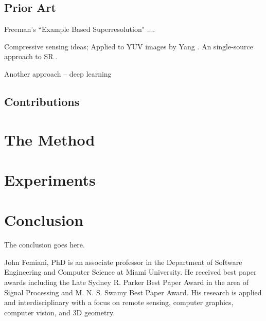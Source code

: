 \documentclass[journal]{IEEEtran}
\begin{document}
\subsection{Prior Art}

%
Freeman's ``Example Based Superresolution" \cite{freeman2002example} ....

Compressive sensing ideas;  Applied to YUV images by Yang \cite{yang2010image}. An single-source approach to \ac{SR}  \cite{lei_single_2012}. 



Another approach -- deep learning \cite{dong_learning_2014}


\subsection{Contributions}




\section{The Method}

\section{Experiments}


\section{Conclusion}
The conclusion goes here.







\begin{IEEEbiography}{John Femiani, PhD}
is an associate professor in the Department of Software Engineering and Computer Science at Miami University. He received best paper awards including the Late Sydney R. Parker Best Paper Award in the area of Signal Processing and M. N. S. Swamy Best Paper Award.  His research is applied and interdisciplinary with a focus on remote sensing, computer graphics, computer vision, and 3D geometry. 

\end{IEEEbiography}
\end{document}
